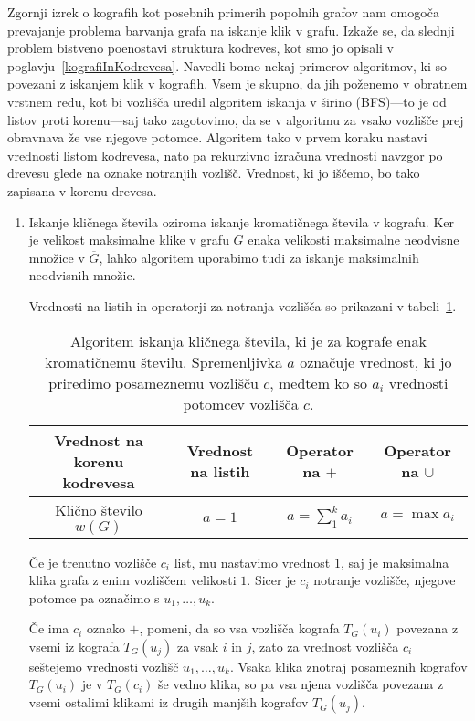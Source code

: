 \documentclass[12pt,a4paper,twoside]{article}
\theoremstyle{definition} %
\theoremstyle{plain} %
\numberwithin{equation}{section}  %
\begin{document}
Zgornji izrek o kografih kot posebnih primerih popolnih grafov nam omogoča prevajanje problema barvanja grafa na iskanje klik v grafu. Izkaže se, da slednji problem bistveno poenostavi struktura kodreves, kot smo jo opisali v poglavju~\ref{kografiInKodrevesa}. Navedli bomo nekaj primerov algoritmov, ki so povezani z iskanjem klik v kografih. Vsem je skupno, da jih poženemo v obratnem vrstnem redu, kot bi vozlišča uredil algoritem iskanja v širino (BFS)---to je od listov proti korenu---saj tako zagotovimo, da se v algoritmu za vsako vozlišče prej obravnava že vse njegove potomce. Algoritem tako v prvem koraku nastavi vrednosti listom kodrevesa, nato pa rekurzivno izračuna vrednosti navzgor po drevesu glede na oznake notranjih vozlišč. Vrednost, ki jo iščemo, bo tako zapisana v korenu drevesa.
\begin{enumerate}[label=($\roman*$)]
\item  Iskanje kličnega števila oziroma iskanje kromatičnega števila v kografu. Ker je velikost maksimalne klike v grafu $G$ enaka velikosti maksimalne neodvisne množice v $\overline{G}$, lahko algoritem uporabimo tudi za iskanje maksimalnih neodvisnih množic.

Vrednosti na listih in operatorji za notranja vozlišča so prikazani v tabeli~\ref{tab:iskanjeKlicnegaStevila}.

\begin{table}[h!]
\begin{adjustbox}{width=\columnwidth,center}
\begin{tabular}{c|ccc}
Vrednost na korenu kodrevesa & Vrednost na listih   & Operator na $+$   &  Operator na $\cup$  \\ \hline
Klično število $w(G)$ & $a=1$    &   $a=\sum_1^k a_i$   &    $a=\max a_i$     
\end{tabular}
\end{adjustbox}
\caption{Algoritem iskanja kličnega števila, ki je za kografe enak kromatičnemu številu. Spremenljivka $a$ označuje vrednost, ki jo priredimo posameznemu vozlišču $c$, medtem ko so $a_i$ vrednosti potomcev vozlišča $c$.}
\label{tab:iskanjeKlicnegaStevila}
\end{table}

Če je trenutno vozlišče $c_i$ list, mu nastavimo vrednost $1$, saj je maksimalna klika grafa z enim vozliščem velikosti $1$. Sicer je $c_i$ notranje vozlišče, njegove potomce pa označimo s $u_1, \dots, u_k$. 

Če ima $c_i$ oznako $+$, pomeni, da so vsa vozlišča kografa $T_G(u_i)$ povezana z vsemi iz kografa $T_G(u_j)$ za vsak $i$ in $j$, zato za vrednost vozlišča $c_i$ seštejemo vrednosti vozlišč $u_1, \dots, u_k$. Vsaka klika znotraj posameznih kografov $T_G(u_i)$ je v $T_G(c_i)$ še vedno klika, so pa vsa njena vozlišča povezana z vsemi ostalimi klikami iz drugih manjših kografov $T_G(u_j)$.


\end{enumerate}
\end{document}
